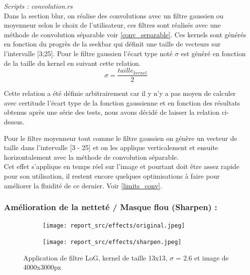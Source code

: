         \emph{Scripts : convolution.rs} 
        \\

        Dans la section blur, on réalise des convolutions avec un filtre gaussien ou moyenneur selon le choix de l'utilisateur,
        ces filtres sont réalisés avec une méthode de convolution séparable voir \ref{conv_separable}. Ces kernels sont générés en fonction du progrès de la seekbar qui
        définit une taille de vecteurs sur l'intervalle [3;25]. Pour le filtre gaussien l'écart type noté $\sigma$ est généré en fonction de la taille du kernel en suivant
        cette relation.
        \[
            \sigma  =  \frac{taille_{kernel}}{2}            
        \]

        Cette relation a été définie arbitrairement car il y n'y a pas moyen de calculer avec certitude l'écart type de la fonction gaussienne et en fonction des résultats
        obtenus après une série des tests, nous avons décidé de laisser la relation ci-dessus.

        Pour le filtre moyenneur tout comme le filtre gaussien on génère un vecteur de taille dans l'intervalle [3 - 25] et on les applique verticalement et ensuite horizontalement
        avec la méthode de convolution séparable.
        \\
        
        Cet effet s'applique en temps réel sur l'image et pourtant doit être assez rapide pour son utilisation, il restent encore quelques optimisations à faire
        pour améliorer la fluidité de ce dernier. Voir \ref{limits_conv}.
        \\
        


    \subsubsection{Amélioration de la netteté / Masque flou (Sharpen) : } \label{sharpen}

        \begin{figure}[!h]
            \centering
            \begin{subfigure}[b]{0.4\textwidth}
                \texttt{[image: report\_src/effects/original.jpeg]}
            \end{subfigure}
            \begin{subfigure}[b]{0.4\textwidth}
                \texttt{[image: report\_src/effects/sharpen.jpeg]}
            \end{subfigure}
            \caption*{Application de filtre LoG, kernel de taille 13x13, $\sigma$ = 2.6 et image de 4000x3000px}
        \end{figure} 
        
